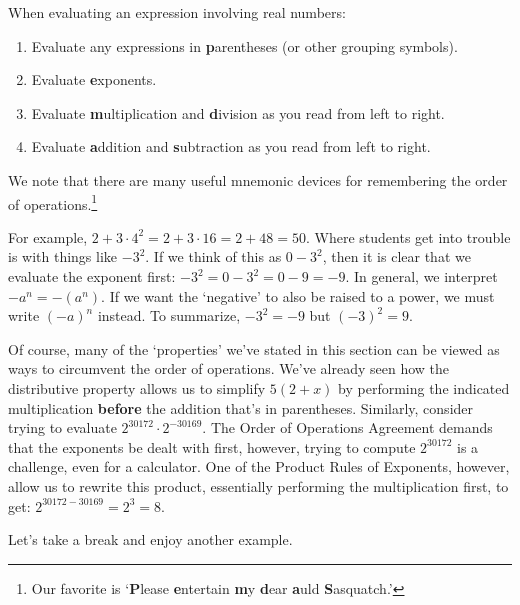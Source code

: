 \documentclass{ximera}
\begin{document}
\vspace{.05in}

When evaluating an expression involving real numbers:

\begin{enumerate}

\item  Evaluate any expressions in \textbf{p}arentheses (or other grouping symbols).
\item  Evaluate \textbf{e}xponents.
\item  Evaluate \textbf{m}ultiplication and \textbf{d}ivision as you read from left to right.
\item  Evaluate \textbf{a}ddition and \textbf{s}ubtraction as you read from left to right.

\end{enumerate}

We note that there are many useful mnemonic devices for remembering the order of operations.\footnote{Our favorite is  `\textbf{P}lease \textbf{e}ntertain \textbf{m}y \textbf{d}ear \textbf{a}uld \textbf{S}asquatch.'}  


\medskip

For example, $2 + 3\cdot 4^2 = 2 + 3\cdot 16 = 2 + 48 = 50$.  Where students get into trouble is with things like $-3^2$.  If we think of this as $0 - 3^2$, then it is clear that we evaluate the exponent first:  $-3^2 =0 -3^2 =0 -9 = -9$.  In general, we interpret $-a^n = -\left(a^n\right)$.  If we want the `negative' to also be raised to a power, we must  write $(-a)^n$ instead.  To summarize, $-3^2 = -9$ but $(-3)^2  = 9$. 

\smallskip

Of course, many of the `properties' we've stated in this section can be viewed as ways to circumvent the order of operations. We've already seen how the distributive property allows us to simplify $5(2+x)$ by performing the indicated multiplication \textbf{before} the addition that's in parentheses.  Similarly, consider trying to evaluate $2^{30172}\cdot 2^{-30169}$.  The Order of Operations Agreement demands that the exponents be dealt with first, however, trying to compute $2^{30172}$ is a challenge, even for a calculator.  One of the Product Rules of Exponents, however, allow us to rewrite this product, essentially performing the multiplication first, to get:  $2^{30172-30169} = 2^{3} = 8$.  

\smallskip

Let's take a break and enjoy another example.
\end{document}
